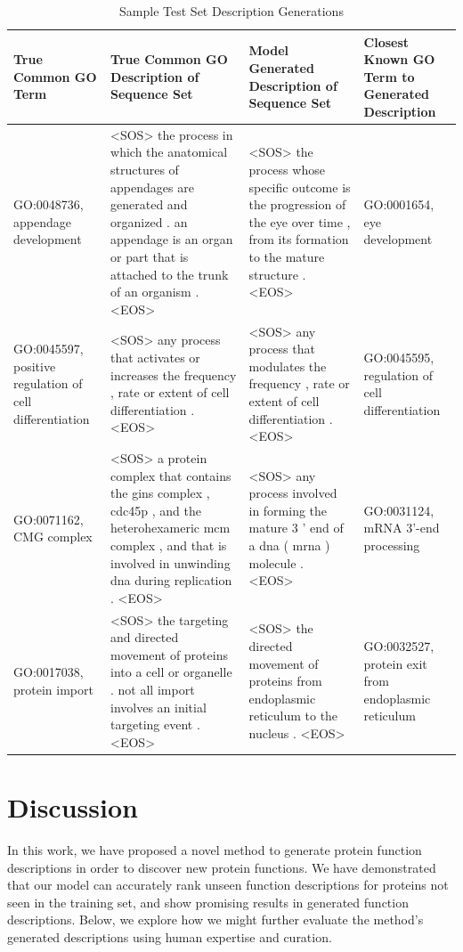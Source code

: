 \documentclass{article}
\begin{document}
\begin{table}
	\caption{Sample Test Set Description Generations}
	\centering
    \begin{tabular}{p{2 cm}|p{5 cm}|p{5 cm}|p{2 cm}}
		\toprule
        True Common GO Term & True Common GO Description of Sequence Set & Model Generated Description of Sequence Set & Closest Known GO Term to Generated Description\\
		\midrule
        GO:0048736, appendage development & <SOS> the process in which the anatomical structures of appendages are generated and organized . an appendage is an organ or part that is attached to the trunk of an organism . <EOS> & <SOS> the process whose specific outcome is the progression of the eye over time , from its formation to the mature structure . <EOS> & GO:0001654, eye development \\ \hline
        GO:0045597, positive regulation of cell differentiation & <SOS> any process that activates or increases the frequency , rate or extent of cell differentiation . <EOS> & <SOS> any process that modulates the frequency , rate or extent of cell differentiation . <EOS> & GO:0045595, regulation of cell differentiation  \\ \hline
        GO:0071162, CMG complex & <SOS> a protein complex that contains the gins complex , cdc45p , and the heterohexameric mcm complex , and that is involved in unwinding dna during replication . <EOS> & <SOS> any process involved in forming the mature 3 ' end of a dna ( mrna ) molecule . <EOS> & GO:0031124, mRNA 3'-end processing \\
        \hline
        GO:0017038, protein import & <SOS> the targeting and directed movement of proteins into a cell or organelle . not all import involves an initial targeting event . <EOS> & <SOS> the directed movement of proteins from endoplasmic reticulum to the nucleus . <EOS> & GO:0032527, protein exit from endoplasmic reticulum \\
		\bottomrule
	\end{tabular}
    \label{tab:descriptions}
\end{table}

\section{Discussion}
In this work, we have proposed a novel method to generate protein function descriptions in order to discover new protein functions.
We have demonstrated that our model can accurately rank unseen function descriptions for proteins not seen in the training set, and show promising results in generated function descriptions.
Below, we explore how we might further evaluate the method's generated descriptions using human expertise and curation.
\end{document}
